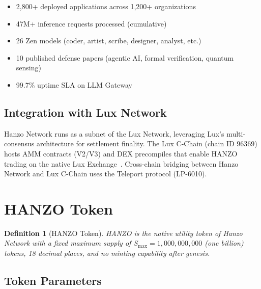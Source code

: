 \documentclass[11pt]{article}
\newtheorem{definition}{Definition}
\begin{document}
\begin{itemize}[leftmargin=1.1em]
    \item 2,800+ deployed applications across 1,200+ organizations
    \item 47M+ inference requests processed (cumulative)
    \item 26 Zen models (coder, artist, scribe, designer, analyst, etc.)
    \item 10 published defense papers (agentic AI, formal verification, quantum sensing)
    \item 99.7\% uptime SLA on LLM Gateway
\end{itemize}

\subsection{Integration with Lux Network}

Hanzo Network runs as a subnet of the Lux Network, leveraging Lux's
multi-consensus architecture for settlement finality. The Lux C-Chain (chain ID
96369) hosts AMM contracts (V2/V3) and DEX precompiles that enable HANZO trading
on the native Lux Exchange~\cite{luxwhitepaper}. Cross-chain bridging between
Hanzo Network and Lux C-Chain uses the Teleport protocol (LP-6010).

\section{HANZO Token}
\label{sec:token}

\begin{definition}[HANZO Token]
HANZO is the native utility token of Hanzo Network with a fixed maximum supply of
$S_{\max} = 1{,}000{,}000{,}000$ (one billion) tokens, 18 decimal places, and no
minting capability after genesis.
\end{definition}

\subsection{Token Parameters}
\end{document}
